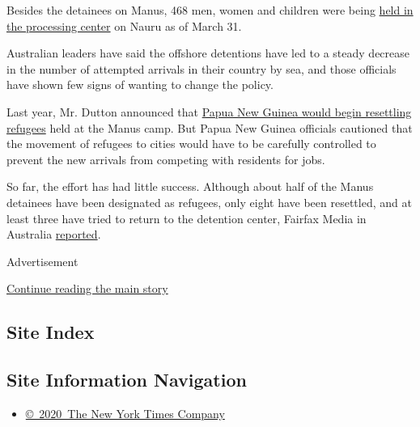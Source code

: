 Besides the detainees on Manus, 468 men, women and children were being
\href{https://www.border.gov.au/ReportsandPublications/Documents/statistics/immigration-detention-statistics-31-mar-2016.pdf}{held
in the processing center} on Nauru as of March 31.

Australian leaders have said the offshore detentions have led to a
steady decrease in the number of attempted arrivals in their country by
sea, and those officials have shown few signs of wanting to change the
policy.

Last year, Mr. Dutton announced that
\href{http://www.nytimes.com/2015/10/24/world/australia/papua-new-guinea-to-resettle-refugees-from-australian-detention-center.html}{Papua
New Guinea would begin resettling refugees} held at the Manus camp. But
Papua New Guinea officials cautioned that the movement of refugees to
cities would have to be carefully controlled to prevent the new arrivals
from competing with residents for jobs.

So far, the effort has had little success. Although about half of the
Manus detainees have been designated as refugees, only eight have been
resettled, and at least three have tried to return to the detention
center, Fairfax Media in Australia
\href{http://www.smh.com.au/federal-politics/political-news/papua-new-guinea-court-finds-australias-detention-of-asylum-seekers-on-manus-island-is-illegal-20160426-gofaaj.html}{reported}.

Advertisement

\protect\hyperlink{after-bottom}{Continue reading the main story}

\hypertarget{site-index}{%
\subsection{Site Index}\label{site-index}}

\hypertarget{site-information-navigation}{%
\subsection{Site Information
Navigation}\label{site-information-navigation}}

\begin{itemize}
\tightlist
\item
  \href{https://help.nytimes.com/hc/en-us/articles/115014792127-Copyright-notice}{©~2020~The
  New York Times Company}
\end{itemize}


